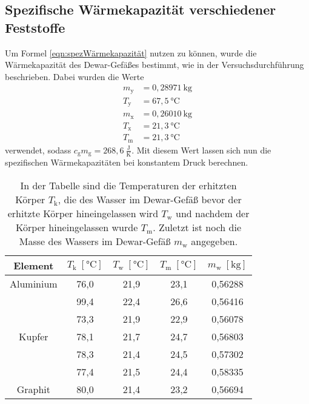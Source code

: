 \documentclass[titlepage = firstcover]{scrartcl}
\begin{document}
        \subsection{Spezifische Wärmekapazität verschiedener Feststoffe}
            Um Formel \eqref{eqn:spezWärmekapazität} nutzen zu können, wurde die Wärmekapazität des Dewar-Gefäßes bestimmt, wie in der Versuchsdurchführung
            beschrieben. Dabei wurden die Werte 
            \begin{align*}
                m_{\text{y}} &= 0,28971 \:\text{kg} \\
                T_{\text{y}} &= 67,5 \:\text{°C} \\
                m_{\text{x}} &= 0,26010 \: \text{kg} \\
                T_{\text{x}} &= 21,3 \:\text{°C} \\
                T_{\text{m}} &= 21,3 \:\text{°C} 
            \end{align*}
            verwendet, sodass $c_\text{g} m_\text{g} = 268,6 \: \frac{\text{J}}{\text{K}}$. Mit diesem Wert lassen sich nun die spezifischen Wärmekapazitäten
            bei konstantem Druck berechnen.
            \begin{table}[h]
                \centering
                \caption{In der Tabelle sind die Temperaturen der erhitzten Körper $T_{\text{k}}$, die des Wasser im Dewar-Gefäß bevor der erhitzte Körper hineingelassen wird $T_{\text{w}}$ und nachdem der Körper hineingelassen wurde $T_{\text{m}}$. Zuletzt ist noch die Masse des Wassers im Dewar-Gefäß $m_{\text{w}}$ angegeben.}
                \label{tab:Tabelle1}

                \begin{tabular}{c c c c c}
                    \toprule
                    {Element} & {$T_{\text{k}} \; [\text{°C}] $} & {$T_{\text{w}} \; [\text{°C}]$} &  {$T_{\text{m}} \; [\text{°C}]$} & {$m_{\text{w}} \; [\text{kg}]$}\\
                    \midrule
                    Aluminium & 76,0 & 21,9 & 23,1 & 0,56288 \\
                              & 99,4 & 22,4 & 26,6 & 0,56416 \\
                              & 73,3 & 21,9 & 22,9 & 0,56078 \\
                    Kupfer    & 78,1 & 21,7 & 24,7 & 0,56803 \\
                              & 78,3 & 21,4 & 24,5 & 0,57302 \\
                              & 77,4 & 21,5 & 24,4 & 0,58335 \\
                    Graphit   & 80,0 & 21,4 & 23,2 & 0,56694 \\
                    \bottomrule
                \end{tabular}

            \end{table}
            
\end{document}
